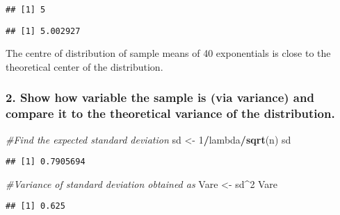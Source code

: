 \documentclass[
]{article}
\newenvironment{Shaded}{\begin{snugshade}}{\end{snugshade}}
\newcommand{\CommentTok}[1]{\textcolor[rgb]{0.56,0.35,0.01}{\textit{#1}}}
\newcommand{\DecValTok}[1]{\textcolor[rgb]{0.00,0.00,0.81}{#1}}
\newcommand{\KeywordTok}[1]{\textcolor[rgb]{0.13,0.29,0.53}{\textbf{#1}}}
\newcommand{\NormalTok}[1]{#1}
\newcommand{\OperatorTok}[1]{\textcolor[rgb]{0.81,0.36,0.00}{\textbf{#1}}}
\newcommand{\StringTok}[1]{\textcolor[rgb]{0.31,0.60,0.02}{#1}}
\begin{document}
\begin{verbatim}
## [1] 5
\end{verbatim}

\begin{Shaded}
\end{Shaded}

\begin{verbatim}
## [1] 5.002927
\end{verbatim}

The centre of distribution of sample means of 40 exponentials is close
to the theoretical center of the distribution.

\hypertarget{show-how-variable-the-sample-is-via-variance-and-compare-it-to-the-theoretical-variance-of-the-distribution.}{%
\subsubsection{2. Show how variable the sample is (via variance) and
compare it to the theoretical variance of the
distribution.}\label{show-how-variable-the-sample-is-via-variance-and-compare-it-to-the-theoretical-variance-of-the-distribution.}}

\begin{Shaded}
\begin{Highlighting}[]
\CommentTok{#Find the expected standard deviation }
\NormalTok{sd <-}\StringTok{ }\DecValTok{1}\OperatorTok{/}\NormalTok{lambda}\OperatorTok{/}\KeywordTok{sqrt}\NormalTok{(n)}
\NormalTok{sd}
\end{Highlighting}
\end{Shaded}

\begin{verbatim}
## [1] 0.7905694
\end{verbatim}

\begin{Shaded}
\begin{Highlighting}[]
\CommentTok{#Variance of standard deviation obtained as}
\NormalTok{Vare <-}\StringTok{ }\NormalTok{sd}\OperatorTok{^}\DecValTok{2}
\NormalTok{Vare}
\end{Highlighting}
\end{Shaded}

\begin{verbatim}
## [1] 0.625
\end{verbatim}
\end{document}
